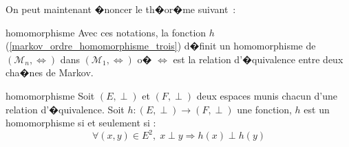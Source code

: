 On peut maintenant �noncer le th�or�me suivant~:


        \begin{xtheorem}{homomorphisme}
        \label{markov_ordre_homomorphisme_trois_th}%
        Avec ces notations, la fonction $h$ (\ref{markov_ordre_homomorphisme_trois}) d�finit un homomorphisme de $\left(\mathcal{M}_{n} ,
        \Longleftrightarrow \right)$ dans $\left( \mathcal{M}_{1},\Longleftrightarrow\right)  $ o� $\Longleftrightarrow$ 
        est la relation d'�quivalence    entre deux cha�nes de Markov.
        \end{xtheorem}






        \begin{xdefinition}{homomorphisme}
        \label{definition_mmc_homomorphisme}%
        Soit $\left(  E,\perp\right)  $ et $\left(  F,\perp\right)  $ deux espaces munis chacun 
        d'une relation d'�quivalence.\newline%
        Soit $h:\left( E,\perp\right) \longrightarrow\left(  F,\perp\right)  $ une fonction, $h$ est un homomorphisme 
        si et seulement si :
                $$
                \forall\left(  x,y\right)  \in E^{2},\; x\perp y\Longrightarrow h\left(  x\right)  \perp h\left(y\right)
                $$
        \end{xdefinition}
        



